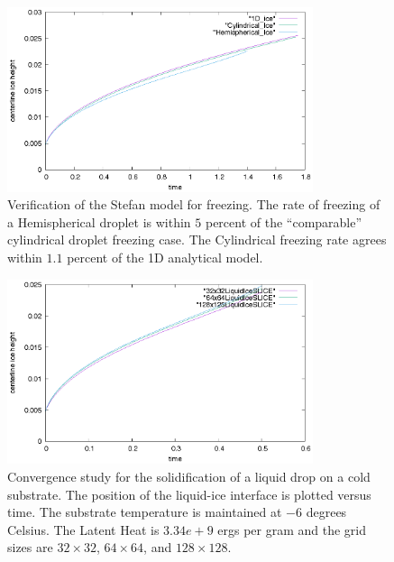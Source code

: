 \documentclass[]{article}
\begin{document}
\begin{figure}[htbp]
\centering
\includegraphics[width=0.8\textwidth]{freezing_verification.eps}
\caption{Verification of the Stefan model for freezing.
  The rate of freezing of a Hemispherical droplet is within 
  $5$ percent of the ``comparable'' cylindrical droplet freezing case.
  The Cylindrical freezing rate agrees within $1.1$ percent of the
  1D analytical model.}
 \label{freezing_verification}
\end{figure}


\begin{figure}[htbp]
\centering
\includegraphics[width=0.8\textwidth]{ICE_HEIGHT.eps}
\caption{Convergence study for the solidification of a liquid drop
 on a cold substrate.  The position of the liquid-ice interface is
 plotted versus time.
 The substrate temperature is maintained at $-6$ degrees Celsius. 
 The Latent Heat is $3.34e+9$ ergs per gram and
 the grid sizes are 
 $32\times 32$,
 $64\times 64$, and
 $128\times 128$. }
 \label{freezing_conv_study}
\end{figure}


\end{document}
